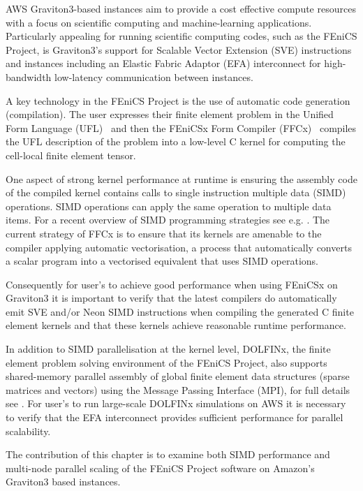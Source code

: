 AWS Graviton3-based instances aim to provide a cost effective compute resources
with a focus on scientific computing and machine-learning applications.
Particularly appealing for running scientific computing codes, such as the
FEniCS Project, is Graviton3's support for Scalable Vector Extension (SVE)
instructions and instances including an Elastic Fabric Adaptor (EFA)
interconnect for high-bandwidth low-latency communication between instances.

A key technology in the FEniCS Project is the use of automatic code generation
(compilation). The user expresses their finite element problem in the Unified
Form Language (UFL)~\citep{alnaes_unified_2014} and then the FEniCSx Form
Compiler (FFCx)~\citep{kirby_compiler_2006} compiles the UFL description of the
problem into a low-level C kernel for computing the cell-local finite element
tensor.

One aspect of strong kernel performance at runtime is ensuring the assembly
code of the compiled kernel contains calls to single instruction multiple data
(SIMD) operations. SIMD operations can apply the same operation to multiple
data items. For a recent overview of SIMD programming strategies see e.g.
\citep{rocke_evaluation_2023}. The current strategy of FFCx is to ensure
that its kernels are amenable to the compiler applying automatic vectorisation,
a process that automatically converts a scalar program into a vectorised
equivalent that uses SIMD operations.
 
Consequently for user's to achieve good performance when using FEniCSx on
Graviton3 it is important to verify that the latest compilers do automatically
emit SVE and/or Neon SIMD instructions when compiling the generated C finite
element kernels and that these kernels achieve reasonable runtime performance. 

In addition to SIMD parallelisation at the kernel level, DOLFINx, the finite
element problem solving environment of the FEniCS Project, also supports
shared-memory parallel assembly of global finite element data structures
(sparse matrices and vectors) using the Message Passing Interface (MPI), for
full details see \cite{baratta_dolfinx_2023}. For user's to run large-scale
DOLFINx simulations on AWS it is necessary to verify that the EFA interconnect
provides sufficient performance for parallel scalability.

The contribution of this chapter is to examine both SIMD performance and
multi-node parallel scaling of the FEniCS Project software on Amazon's
Graviton3 based instances. 

